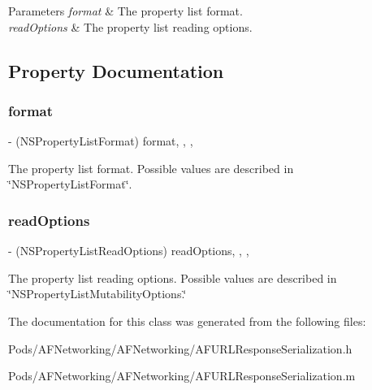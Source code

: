 \begin{DoxyParams}{Parameters}
{\em format} & The property list format. \\
\hline
{\em read\+Options} & The property list reading options. \\
\hline
\end{DoxyParams}


\subsection{Property Documentation}
\mbox{\label{interface_a_f_property_list_response_serializer_a616f88e89a24ca953c50e40f85177293}} 
\subsubsection{\texorpdfstring{format}{format}}
{\footnotesize\ttfamily -\/ (N\+S\+Property\+List\+Format) format\hspace{0.3cm}{\ttfamily [read]}, {\ttfamily [write]}, {\ttfamily [nonatomic]}, {\ttfamily [assign]}}

The property list format. Possible values are described in \char`\"{}\+N\+S\+Property\+List\+Format\char`\"{}. \mbox{\label{interface_a_f_property_list_response_serializer_a6913e8c365408a0800eb08b5396522f0}} 
\subsubsection{\texorpdfstring{read\+Options}{readOptions}}
{\footnotesize\ttfamily -\/ (N\+S\+Property\+List\+Read\+Options) read\+Options\hspace{0.3cm}{\ttfamily [read]}, {\ttfamily [write]}, {\ttfamily [nonatomic]}, {\ttfamily [assign]}}

The property list reading options. Possible values are described in \char`\"{}\+N\+S\+Property\+List\+Mutability\+Options.\char`\"{} 

The documentation for this class was generated from the following files\+:\begin{DoxyCompactItemize}
\item 
Pods/\+A\+F\+Networking/\+A\+F\+Networking/A\+F\+U\+R\+L\+Response\+Serialization.\+h\item 
Pods/\+A\+F\+Networking/\+A\+F\+Networking/A\+F\+U\+R\+L\+Response\+Serialization.\+m\end{DoxyCompactItemize}
